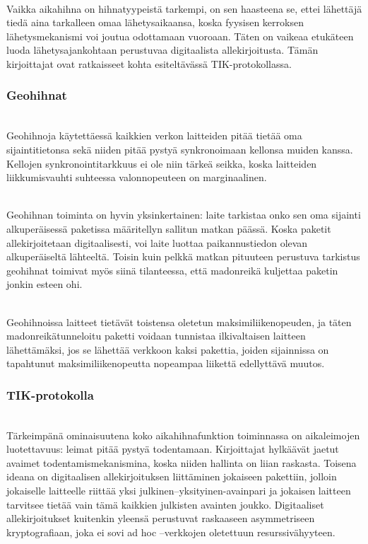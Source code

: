 \documentclass[finnish]{tktltiki2}
\theoremstyle{definition}
\theoremstyle{remark}
\begin{document}
\noindent \\
Vaikka aikahihna on hihnatyypeistä tarkempi, on sen haasteena se, ettei lähettäjä tiedä aina tarkalleen omaa lähetysaikaansa, koska fyysisen kerroksen lähetysmekanismi voi joutua odottamaan vuoroaan. Täten on vaikeaa etukäteen luoda lähetysajankohtaan perustuvaa digitaalista allekirjoitusta. Tämän kirjoittajat ovat ratkaisseet kohta esiteltävässä TIK-protokollassa.

\subsubsection{Geohihnat}
\noindent \\
Geohihnoja käytettäessä kaikkien verkon laitteiden pitää tietää oma sijaintitietonsa sekä niiden pitää pystyä synkronoimaan kellonsa muiden kanssa. Kellojen synkronointitarkkuus ei ole niin tärkeä seikka, koska laitteiden liikkumisvauhti suhteessa valonnopeuteen on marginaalinen.

\noindent \\
Geohihnan toiminta on hyvin yksinkertainen: laite tarkistaa onko sen oma sijainti alkuperäisessä paketissa määritellyn sallitun matkan päässä. Koska paketit allekirjoitetaan digitaalisesti, voi laite luottaa paikannustiedon olevan alkuperäiseltä lähteeltä. Toisin kuin pelkkä matkan pituuteen perustuva tarkistus geohihnat toimivat myös siinä tilanteessa, että madonreikä kuljettaa paketin jonkin esteen ohi.

\noindent \\
Geohihnoissa laitteet tietävät toistensa oletetun maksimiliikenopeuden, ja täten madonreikätunneloitu paketti voidaan tunnistaa ilkivaltaisen laitteen lähettämäksi, jos se lähettää verkkoon kaksi pakettia, joiden sijainnissa on tapahtunut maksimiliikenopeutta nopeampaa liikettä edellyttävä muutos.

\subsubsection{TIK-protokolla} 
\label{tik}
\noindent \\
Tärkeimpänä ominaisuutena koko aikahihnafunktion toiminnassa on aikaleimojen luotettavuus: leimat pitää pystyä todentamaan. Kirjoittajat hylkäävät jaetut avaimet todentamismekanismina, koska niiden hallinta on liian raskasta. Toisena ideana on digitaalisen allekirjoituksen liittäminen jokaiseen pakettiin, jolloin jokaiselle laitteelle riittää yksi julkinen--yksityinen-avainpari ja jokaisen laitteen tarvitsee tietää vain tämä kaikkien julkisten avainten joukko. Digitaaliset allekirjoitukset kuitenkin yleensä perustuvat raskaaseen asymmetriseen kryptografiaan, joka ei sovi ad hoc –verkkojen oletettuun resurssivähyyteen.
\end{document}
